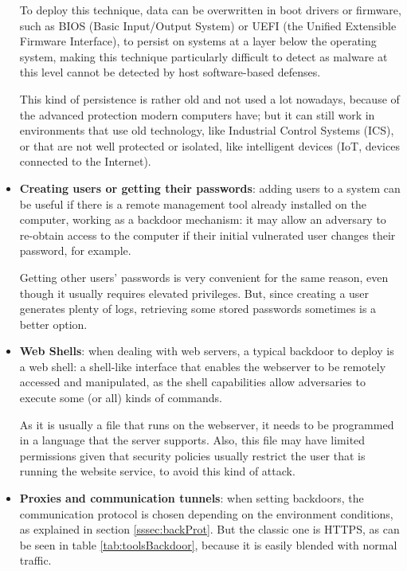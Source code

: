 \begin{itemize}
\pagebreak
To deploy this technique, data can be overwritten in boot drivers or firmware, such as BIOS (Basic Input/Output System) or UEFI (the Unified Extensible Firmware Interface), to persist on systems at a layer below the operating system, making this technique particularly difficult to detect as malware at this level cannot be detected by host software-based defenses.

This kind of persistence is rather old and not used a lot nowadays, because of the advanced protection modern computers have; but it can still work in environments that use old technology, like Industrial Control Systems (ICS), or that are not well protected or isolated, like intelligent devices (IoT, devices connected to the Internet).

\bigskip
\item \textbf{Creating users or getting their passwords}: adding users to a system can be useful if there is a remote management tool already installed on the computer, working as a backdoor mechanism: it may allow an adversary to re-obtain access to the computer if their initial vulnerated user changes their password, for example. 

Getting other users' passwords is very convenient for the same reason, even though it usually requires elevated privileges. But, since creating a user generates plenty of logs, retrieving some stored passwords sometimes is a better option.

\bigskip
\item \textbf{Web Shells}: when dealing with web servers, a typical backdoor to deploy is a web shell: a shell-like interface that enables the webserver to be remotely accessed and manipulated, as the shell capabilities allow adversaries to execute some (or all) kinds of commands.

As it is usually a file that runs on the webserver, it needs to be programmed in a language that the server supports. Also, this file may have limited permissions given that security policies usually restrict the user that is running the website service, to avoid this kind of attack.

\bigskip

\pagebreak
\item \textbf{Proxies and communication tunnels}: when setting backdoors, the communication protocol is chosen depending on the environment conditions, as explained in section \ref{sssec:backProt}. But the classic one is HTTPS, as can be seen in table \ref{tab:toolsBackdoor}, because it is easily blended with normal traffic.


\end{itemize}
